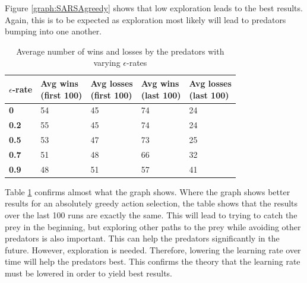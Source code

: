 Figure \ref{graph:SARSAgreedy} shows that low exploration leads to the best results. Again, this is to be expected as exploration most likely will lead to predators bumping into one another.

\begin{table}[H]
\begin{center}
\begin{tabular}{| l | l | l | l | l |}
\hline
\parbox{2cm}{\textbf{$\epsilon$-rate}} & \parbox{2cm}{\textbf{Avg wins \\ (first 100)}} & \parbox{2cm}{\textbf{Avg losses \\ (first 100)}} & \parbox{2cm}{\textbf{Avg wins \\ (last 100)}} & \parbox{2cm}{\textbf{Avg losses \\ (last 100)}} \\
\hline
\textbf{0} & 54 & 45 & 74 & 24 \\
\hline
\textbf{0.2} & 55 & 45 & 74 & 24 \\
\hline
\textbf{0.5} & 53 & 47 & 73 & 25 \\
\hline
\textbf{0.7} & 51 & 48 & 66 & 32 \\
\hline
\textbf{0.9} & 48 & 51 & 57 & 41 \\
\hline
\end{tabular}
\caption{Average number of wins and losses by the predators with varying $\epsilon$-rates}
\label{table:SARSAgreedy}
\end{center}
\end{table}

Table \ref{table:SARSAgreedy} confirms almost what the graph shows. Where the graph shows better results for an absolutely greedy action selection, the table shows that the results over the last 100 runs are exactly the same.  This will lead to trying to catch the prey in the beginning, but exploring other paths to the prey while avoiding other predators is also important. This can help the predators significantly in the future. However, exploration is needed. Therefore, lowering the learning rate over time will help the predators best. This confirms the theory that the learning rate must be lowered in order to yield best results.
